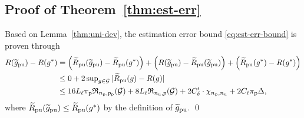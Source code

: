 \subsection{Proof of Theorem~\ref{thm:est-err}}

Based on Lemma~\ref{thm:uni-dev}, the estimation error bound \eqref{eq:est-err-bound} is proven through
\begin{align*}
R(\tgpu)-R(g^*)
&= \left(\tRpu(\tgpu)-\tRpu(g^*)\right)
+\left(R(\tgpu)-\tRpu(\tgpu)\right)
+\left(\tRpu(g^*)-R(g^*)\right)\\
&\le 0 +2\sup\nolimits_{g\in\cG}|\tRpu(g)-R(g)|\\
&\le 16L_\ell\pip\fR_{\Np,\prp}(\cG) +8L_\ell\fR_{\Nu,p}(\cG)
+2C'_\delta\cdot\chi_{\Np,\Nu} +2C_\ell\pip\Delta,
\end{align*}
where $\tRpu(\tgpu)\le\tRpu(g^*)$ by the definition of $\tgpu$. \qed

